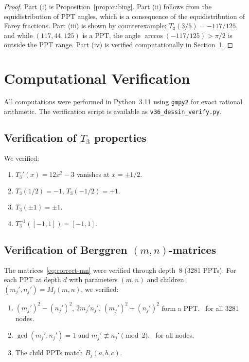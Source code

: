 \documentclass[12pt]{amsart}
\theoremstyle{definition}
\theoremstyle{remark}
\renewcommand{\gcd}{\operatorname{gcd}}
\begin{document}
\begin{proof}
Part (i) is Proposition~\ref{prop:cubing}.  Part (ii) follows from
the equidistribution of PPT angles, which is a consequence of the
equidistribution of Farey fractions.  Part (iii) is shown by
counterexample: $T_3(3/5)=-117/125$, and while $(117,44,125)$ is a PPT,
the angle $\arccos(-117/125)>\pi/2$ is outside the PPT range.
Part (iv) is verified computationally in Section~\ref{sec:computation}.
\end{proof}


\section{Computational Verification}\label{sec:computation}

All computations were performed in Python~3.11 using \texttt{gmpy2} for
exact rational arithmetic.  The verification script is available as
\texttt{v36\_dessin\_verify.py}.

\subsection{Verification of $T_3$ properties}

We verified:
\begin{enumerate}
  \item $T_3'(x) = 12x^2-3$ vanishes at $x=\pm 1/2$.  \checkmark
  \item $T_3(1/2) = -1$, $T_3(-1/2) = +1$.  \checkmark
  \item $T_3(\pm 1) = \pm 1$.  \checkmark
  \item $T_3^{-1}([-1,1]) = [-1,1]$.  \checkmark
\end{enumerate}

\subsection{Verification of Berggren $(m,n)$-matrices}

The matrices~\eqref{eq:correct-mn} were verified through depth~8
(3281 PPTs).  For each PPT at depth $d$ with parameters $(m,n)$
and children $(m_j',n_j') = M_j(m,n)$, we verified:
\begin{enumerate}
  \item $(m_j')^2 - (n_j')^2$, $2m_j'n_j'$, $(m_j')^2+(n_j')^2$ form
        a PPT.  \checkmark\ for all 3281 nodes.
  \item $\gcd(m_j', n_j') = 1$ and $m_j'\not\equiv n_j'\pmod{2}$.
        \checkmark\ for all nodes.
  \item The child PPTs match $B_j(a,b,c)$.  \checkmark
\end{enumerate}
\end{document}
